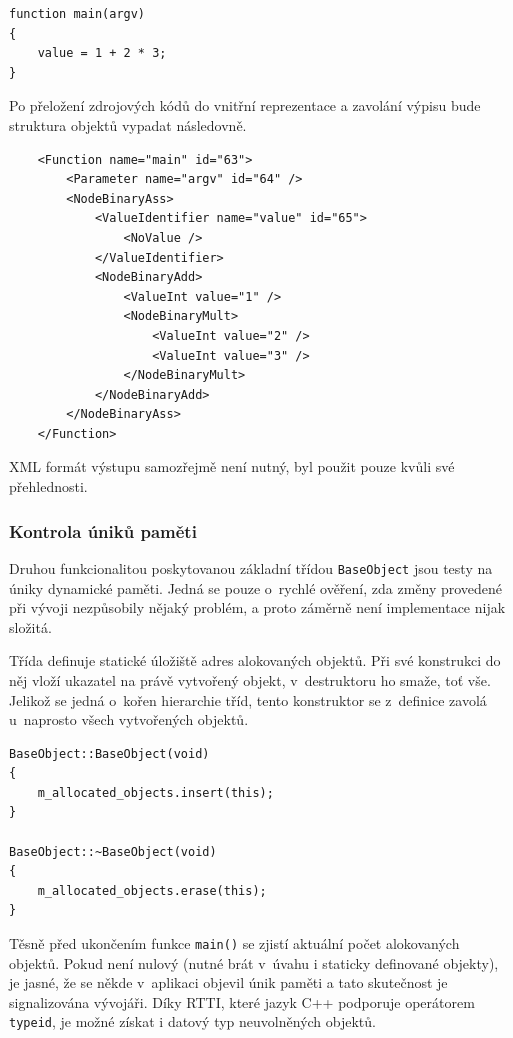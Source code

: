 \documentclass[11pt,twoside,a4paper]{book}
\begin{document}
\begin{verbatim}
function main(argv)
{
    value = 1 + 2 * 3;
}
\end{verbatim}

Po přeložení zdrojových kódů do vnitřní reprezentace a zavolání výpisu bude struktura objektů vypadat následovně.

\begin{verbatim}
    <Function name="main" id="63">
        <Parameter name="argv" id="64" />
        <NodeBinaryAss>
            <ValueIdentifier name="value" id="65">
                <NoValue />
            </ValueIdentifier>
            <NodeBinaryAdd>
                <ValueInt value="1" />
                <NodeBinaryMult>
                    <ValueInt value="2" />
                    <ValueInt value="3" />
                </NodeBinaryMult>
            </NodeBinaryAdd>
        </NodeBinaryAss>
    </Function>
\end{verbatim}

XML formát výstupu samozřejmě není nutný, byl použit pouze kvůli své pře\-hled\-nos\-ti.


\subsubsection{Kontrola úniků paměti}
\label{kontrola_uniku_pameti}

Druhou funkcionalitou poskytovanou základní třídou \texttt{BaseObject} jsou testy na úniky dynamické paměti. Jedná se pouze o~rychlé ověření, zda změny provedené při vývoji nezpůsobily nějaký problém, a proto záměrně není implementace nijak složitá.

Třída definuje statické úložiště adres alokovaných objektů. Při své konstrukci do něj vloží ukazatel na právě vytvořený objekt, v~destruktoru ho smaže, toť vše. Jelikož se jedná o~kořen hierarchie tříd, tento konstruktor se z~definice zavolá u~naprosto všech vytvořených objektů.

\begin{verbatim}
BaseObject::BaseObject(void)
{
    m_allocated_objects.insert(this);
}

BaseObject::~BaseObject(void)
{
    m_allocated_objects.erase(this);
}
\end{verbatim}

Těsně před ukončením funkce \texttt{main()} se zjistí aktuální počet alokovaných objektů. Pokud není nulový (nutné brát v~úvahu i staticky definované objekty), je jasné, že se někde v~aplikaci objevil únik paměti a tato skutečnost je signalizována vývojáři. Díky RTTI, které jazyk C++ podporuje operátorem \texttt{typeid}, je možné získat i datový typ neuvolněných objektů.
\end{document}
